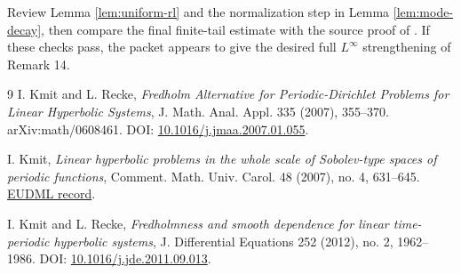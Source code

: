 \documentclass[11pt]{article}
\begin{document}
Review Lemma \ref{lem:uniform-rl} and the normalization step in
Lemma \ref{lem:mode-decay}, then compare the final finite-tail estimate with
the source proof of \cite[(4.10)]{KmitRecke2007}. If these checks pass, the
packet appears to give the desired full \(L^\infty\) strengthening of Remark
14.

\begin{thebibliography}{9}
I. Kmit and L. Recke,
\emph{Fredholm Alternative for Periodic-Dirichlet Problems for Linear
Hyperbolic Systems},
J. Math. Anal. Appl. 335 (2007), 355--370.
arXiv:math/0608461. DOI: \href{https://doi.org/10.1016/j.jmaa.2007.01.055}{10.1016/j.jmaa.2007.01.055}.

I. Kmit,
\emph{Linear hyperbolic problems in the whole scale of Sobolev-type spaces of
periodic functions},
Comment. Math. Univ. Carol. 48 (2007), no. 4, 631--645.
\href{https://eudml.org/doc/250187}{EUDML record}.

I. Kmit and L. Recke,
\emph{Fredholmness and smooth dependence for linear time-periodic hyperbolic
systems},
J. Differential Equations 252 (2012), no. 2, 1962--1986.
DOI: \href{https://doi.org/10.1016/j.jde.2011.09.013}{10.1016/j.jde.2011.09.013}.
\end{thebibliography}
\end{document}
